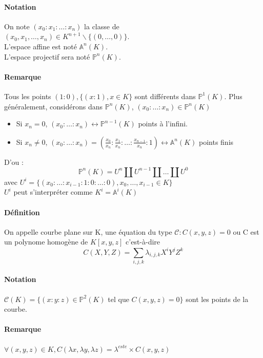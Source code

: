 \documentclass[12pt,a4paper]{report}
\begin{document}
\paragraph{Notation}
On note $(x_0:x_1:\ldots:x_n)$ la classe de\\ $(x_0,x_1,\ldots,x_n) \in K^{n+1}\backslash \{(0,\ldots,0)\}$.\\
L'espace affine est noté $\mathbb{A}^n(K)$.\\
L'espace projectif sera noté $\mathbb{P}^n(K)$.
\paragraph{Remarque\\}
Tous les points $(1:0),\{(x:1),x \in K\} $ sont différents dans $\mathbb{P}^1(K)$. Plus généralement, considérons dans $\mathbb{P}^n(K)$, $(x_0:\ldots:x_n) \in \mathbb{P}^n(K)$
\begin{itemize}
\item Si $x_n=0$, $(x_0:\ldots:x_n) \longleftrightarrow \mathbb{P}^{n-1}(K) $ points à l'infini.
\item Si $x_n \neq 0$, $(x_0:\ldots:x_n)=\left(\frac{x_0}{x_n}: \frac{x_1}{x_n}:\ldots:\frac{x_{n-1}}{x_n}:1\right) \longleftrightarrow \mathbb{A}^n(K) $ points finis
\end{itemize}
D'ou : 
$$ \mathbb{P}^{n}(K)=U^n \amalg U^{n-1} \amalg \ldots \amalg U^0 $$
avec $ U^i=\{ (x_0:\ldots:x_{i-1}:1:0:\ldots:0),x_0,\ldots,x_{i-1} \in K\} $\\
$U^i$ peut s'interpréter comme $K^i = \mathbb{A}^i(K)$
\paragraph{Définition\\}
On appelle courbe plane sur K, une équation du type $\mathcal{C}:C(x,y,z)=0$ ou C est un polynome homogène de $K[x,y,z]$ c'est-à-dire $$\displaystyle C(X,Y,Z)=\sum_{i,j,k}\lambda_{i,j,k} X^i Y^j Z^k $$
\paragraph{Notation\\}
$\mathcal{C}(K)=\{(x:y:z)\in \mathbb{P}^2(K)$ tel que $ C(x,y,z)=0\}$ sont les points de la courbe.
\paragraph{Remarque\\}
$\forall (x,y,z) \in K, C(\lambda x, \lambda y, \lambda z)= \lambda^{cste} \times C(x,y,z) $
\end{document}
